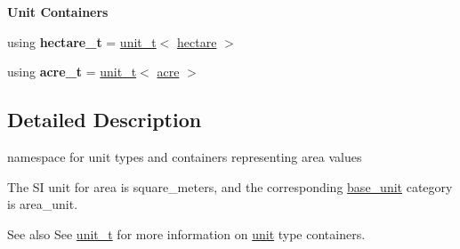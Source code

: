 \begin{Indent}{\bf Unit Containers}
\begin{DoxyCompactItemize}
\item 
\hypertarget{namespaceunits_1_1area_a936df32a4f40607520a726426364fe9e}{}using {\bfseries hectare\+\_\+t} = \hyperlink{classunits_1_1unit__t}{unit\+\_\+t}$<$ \hyperlink{structunits_1_1unit}{hectare} $>$\label{namespaceunits_1_1area_a936df32a4f40607520a726426364fe9e}

\item 
\hypertarget{namespaceunits_1_1area_a8b73c442a90404f5e62ec60c437d4906}{}using {\bfseries acre\+\_\+t} = \hyperlink{classunits_1_1unit__t}{unit\+\_\+t}$<$ \hyperlink{structunits_1_1unit}{acre} $>$\label{namespaceunits_1_1area_a8b73c442a90404f5e62ec60c437d4906}

\end{DoxyCompactItemize}
\end{Indent}


\subsection{Detailed Description}
namespace for unit types and containers representing area values 

The S\+I unit for area is {\ttfamily square\+\_\+meters}, and the corresponding {\ttfamily \hyperlink{structunits_1_1base__unit}{base\+\_\+unit}} category is {\ttfamily area\+\_\+unit}. \begin{DoxySeeAlso}{See also}
See \hyperlink{classunits_1_1unit__t}{unit\+\_\+t} for more information on \hyperlink{structunits_1_1unit}{unit} type containers. 
\end{DoxySeeAlso}
